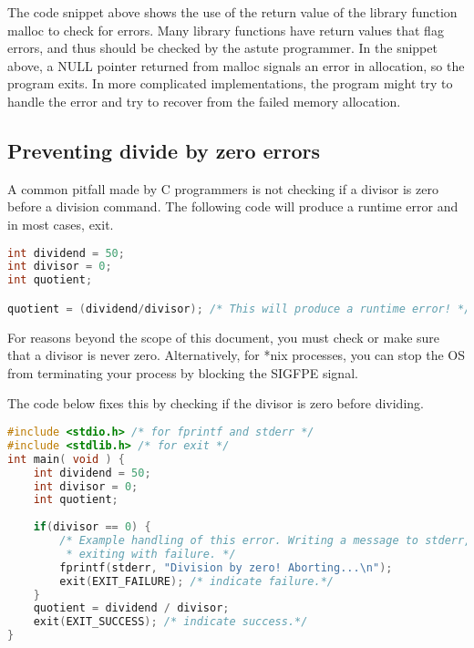 The code snippet above shows the use of the return value of the library
function malloc to check for errors. Many library functions have return values
that flag errors, and thus should be checked by the astute programmer. In the
snippet above, a NULL pointer returned from malloc signals an error in
allocation, so the program exits. In more complicated implementations, the
program might try to handle the error and try to recover from the failed memory
allocation.

\subsection{Preventing divide by zero errors}
A common pitfall made by C programmers is not checking if a divisor is zero
before a division command. The following code will produce a runtime error and
in most cases, exit.
\lstset{basicstyle=\scriptsize, numbers=left, captionpos=b, tabsize=4}
\begin{lstlisting}[caption=Section \thesection listing \arabic{errorcnt},language={C},
breaklines=true,xleftmargin=15pt, label=lst:section\thesection listing\arabic{errorcnt}]
int dividend = 50;
int divisor = 0;
int quotient;

quotient = (dividend/divisor); /* This will produce a runtime error! */
\end{lstlisting}

For reasons beyond the scope of this document, you must check or make sure that
a divisor is never zero. Alternatively, for *nix processes, you can stop the OS
from terminating your process by blocking the SIGFPE signal. 

The code below fixes this by checking if the divisor is zero before dividing.
\lstset{basicstyle=\scriptsize, numbers=left, captionpos=b, tabsize=4}
\begin{lstlisting}[caption=Section \thesection listing \arabic{errorcnt},language={C},
breaklines=true,xleftmargin=15pt, label=lst:section\thesection listing\arabic{errorcnt}]
#include <stdio.h> /* for fprintf and stderr */
#include <stdlib.h> /* for exit */
int main( void ) {
	int dividend = 50;
	int divisor = 0;
	int quotient;
	
	if(divisor == 0) {
		/* Example handling of this error. Writing a message to stderr, and
		 * exiting with failure. */
		fprintf(stderr, "Division by zero! Aborting...\n");
		exit(EXIT_FAILURE); /* indicate failure.*/
	}
	quotient = dividend / divisor;
	exit(EXIT_SUCCESS); /* indicate success.*/
}
\end{lstlisting}


